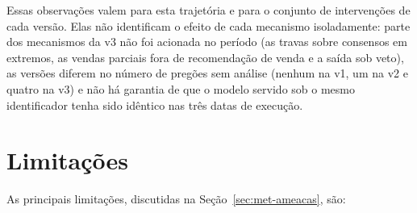 Essas observações valem para esta trajetória e para o conjunto de intervenções de cada versão. Elas não identificam o efeito de cada mecanismo isoladamente: parte dos mecanismos da v3 não foi acionada no período (as travas sobre consensos em extremos, as vendas parciais fora de recomendação de venda e a saída sob veto), as versões diferem no número de pregões sem análise (nenhum na v1, um na v2 e quatro na v3) e não há garantia de que o modelo servido sob o mesmo identificador tenha sido idêntico nas três datas de execução.

\section{Limitações}

As principais limitações, discutidas na Seção~\ref{sec:met-ameacas}, são:


